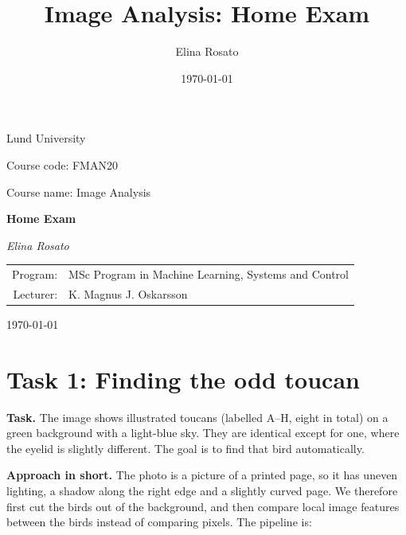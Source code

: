 \documentclass[11pt,a4paper]{article}
\title{Image Analysis: Home Exam}
\author{Elina Rosato}
\date{\today}
\begin{document}
\begin{titlepage}
    \centering
    \vspace*{2cm}

    {\Large Lund University\par}

    \vspace{1.5cm}

    {\large Course code: FMAN20\par}
    {\large Course name: Image Analysis\par}

    \vspace{3cm}

    {\Huge\bfseries Home Exam\par}

    \vspace{3cm}

    {\large\itshape Elina Rosato\par}

    \vspace{2cm}

    \begin{tabular}{rl}
        Program: & MSc Program in Machine Learning, Systems and Control \\[4pt]
        Lecturer: & K. Magnus J. Oskarsson
    \end{tabular}

    \vfill

    {\large \today\par}
\end{titlepage}

\section{Task 1: Finding the odd toucan}

\textbf{Task.} The image shows illustrated toucans (labelled A--H, eight in total) on a green background with a light-blue sky. They are identical except for one, where the eyelid is slightly different. The goal is to find that bird automatically.

\textbf{Approach in short.} The photo is a picture of a printed page, so it has uneven lighting, a shadow along the right edge and a slightly curved page. We therefore first cut the birds out of the background, and then compare local image features between the birds instead of comparing pixels. The pipeline is:
\end{document}
